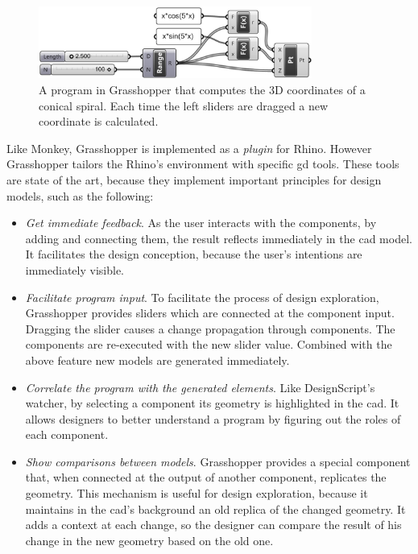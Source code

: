 \begin{figure}[!htbp]
\vspace{-5pt}
  \centering
  \includegraphics[width=0.8\textwidth]{img/grasshopper}
  \vspace{-5pt}
    \caption{A program in Grasshopper that computes the 3D coordinates of a conical spiral. Each time the left sliders are dragged a new coordinate is calculated.}
  \label{fig:grass}
  \vspace{-10pt}
\end{figure}

Like Monkey, Grasshopper is implemented as a \textit{plugin} for Rhino\footnotemark[\ref{rhin}]. However Grasshopper tailors the Rhino's environment with specific \ac{gd} tools. These tools are state of the art, because they implement important principles for design models, such as the following:

\begin{itemize}
 \item \textit{Get immediate feedback}. As the user interacts with the components, by adding and connecting them, the result reflects immediately in the \ac{cad} model. It facilitates the design conception, because the user's intentions are immediately visible. 
 \item \textit{Facilitate program input}. To facilitate the process of design exploration, Grasshopper provides sliders which are connected at the component input. Dragging the slider causes a change propagation through components. The components are re-executed with the new slider value. Combined with the above feature new models are generated immediately.
 \item \textit{Correlate the program with the generated elements}. Like DesignScript's watcher, by selecting a component its geometry is highlighted in the \ac{cad}. It allows designers to better understand a program by figuring out the roles of each component.
 \item \textit{Show comparisons between models}. Grasshopper provides a special component that, when connected at the output of another component, replicates the geometry. This mechanism is useful for design exploration, because it maintains in the \ac{cad}'s background an old replica of the changed geometry. It adds a context at each change, so the designer can compare the result of his change in the new geometry based on the old one.
\end{itemize}

